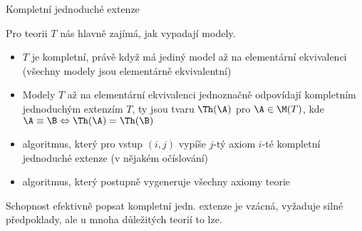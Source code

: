 \documentclass{beamer}
\begin{document}
\begin{frame}{Kompletní jednoduché extenze}

    \vspace{-6pt}

    \pause
    Pro teorii $T$ nás hlavně zajímá, jak vypadají modely.

    \pause
    \vspace{-6pt}
    \begin{itemize}
        \item $T$ je \alert{kompletní}, právě když má jediný model až na elementární ekvivalenci (všechny modely jsou elementárně ekvivalentní)\pause
        \item Modely $T$ až na elementární ekvivalenci jednoznačně odpovídají \alert{kompletním jednoduchým extenzím} $T$, ty jsou tvaru $\Th(\A)$ pro $\A\in\M(T)$, kde $\A\equiv\B\Leftrightarrow\Th(\A)=\Th(\B)$
    \end{itemize}
    
    \pause

    \pause
    
    \pause
    \begin{itemize}
        \item algoritmus, který pro vstup $(i,j)$ vypíše $j$-tý axiom $i$-té kompletní jednoduché extenze (v nějakém očíslování)\pause
        \item algoritmus, který postupně vygeneruje všechny axiomy teorie
    \end{itemize}

    \pause
    Schopnost efektivně popsat kompletní jedn. extenze je vzácná, vyžaduje silné předpoklady, ale u mnoha důležitých teorií to lze. 

\end{frame}
\end{document}
